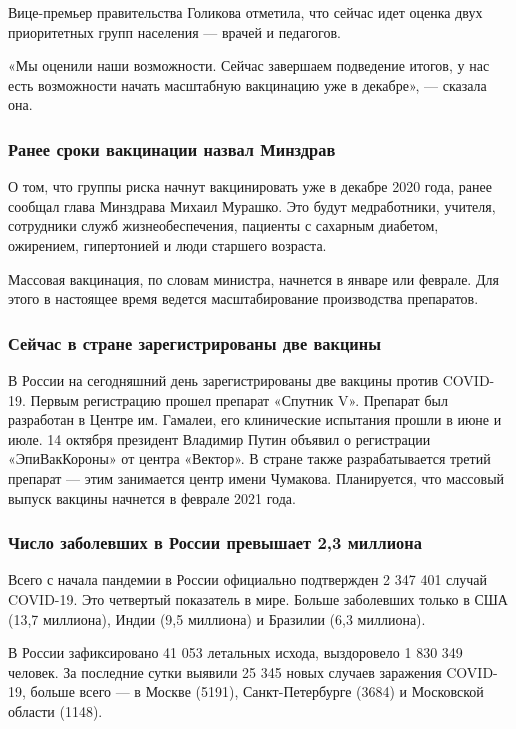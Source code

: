 Вице-премьер правительства Голикова отметила, что сейчас идет оценка двух
приоритетных групп населения — врачей и педагогов.

«Мы оценили наши возможности. Сейчас завершаем подведение итогов, у нас есть
возможности начать масштабную вакцинацию уже в декабре», — сказала она.

\subsubsection{Ранее сроки вакцинации назвал Минздрав}

О том, что группы риска начнут вакцинировать уже в декабре 2020 года, ранее
сообщал глава Минздрава Михаил Мурашко. Это будут медработники, учителя,
сотрудники служб жизнеобеспечения, пациенты с сахарным диабетом, ожирением,
гипертонией и люди старшего возраста.

Массовая вакцинация, по словам министра, начнется в январе или феврале. Для
этого в настоящее время ведется масштабирование производства препаратов.

\subsubsection{Сейчас в стране зарегистрированы две вакцины}

В России на сегодняшний день зарегистрированы две вакцины против COVID-19.
Первым регистрацию прошел препарат «Спутник V». Препарат был разработан в
Центре им. Гамалеи, его клинические испытания прошли в июне и июле. 14 октября
президент Владимир Путин объявил о регистрации «ЭпиВакКороны» от центра
«Вектор». В стране также разрабатывается третий препарат — этим занимается
центр имени Чумакова. Планируется, что массовый выпуск вакцины начнется в
феврале 2021 года.

\subsubsection{Число заболевших в России превышает 2,3 миллиона}

Всего с начала пандемии в России официально подтвержден 2 347 401 случай
COVID-19. Это четвертый показатель в мире. Больше заболевших только в США (13,7
миллиона), Индии (9,5 миллиона) и Бразилии (6,3 миллиона).

В России зафиксировано 41 053 летальных исхода, выздоровело 1 830 349 человек.
За последние сутки выявили 25 345 новых случаев заражения COVID-19, больше
всего — в Москве (5191), Санкт-Петербурге (3684) и Московской области (1148).
